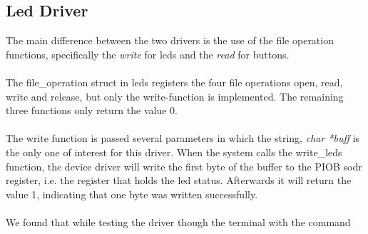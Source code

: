 \subsection{Led Driver}
The main difference between the two drivers is the use of the file operation
functions, specifically the \textit{write} for leds and the \textit{read} for
buttons.\\
\\
The file\_operation struct in leds registers the four file operations open,
read, write and release, but only the write-function is implemented.
The remaining three functions only return the value 0.\\
\\
The write function is passed several parameters in which the string,
\textit{char *buff} is the only one of interest for this driver.
When the system calls the write\_leds function, the device driver will 
write the first byte of the buffer to the PIOB sodr register, i.e. the register
that holds the led status. Afterwards it will return the value 1, indicating that
one byte was written successfully.\\
\\
We found that while testing the driver though the terminal with the command 